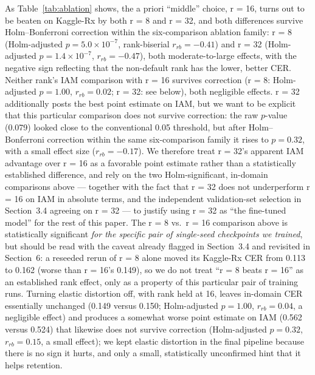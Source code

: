 \documentclass[12pt]{article}
\begin{document}
As Table~\ref{tab:ablation} shows, the a priori ``middle'' choice, r = 16, turns out to be beaten on
Kaggle-Rx by both r = 8 and r = 32, and both differences survive Holm--Bonferroni correction within the
six-comparison ablation family: r = 8 (Holm-adjusted $p = 5.0\times10^{-7}$, rank-biserial $r_{rb} = -0.41$)
and r = 32 (Holm-adjusted $p = 1.4\times10^{-7}$, $r_{rb} = -0.47$), both moderate-to-large effects, with the
negative sign reflecting that the non-default rank has the lower, better CER. Neither rank's IAM comparison
with r = 16 survives correction (r = 8: Holm-adjusted $p = 1.00$, $r_{rb} = 0.02$; r = 32: see below), both
negligible effects. r = 32 additionally posts the
best point estimate on IAM, but we want to be explicit that this particular comparison does not survive
correction: the raw $p$-value (0.079) looked close to the conventional 0.05 threshold, but after
Holm--Bonferroni correction within the same six-comparison family it rises to $p = 0.32$, with a small
effect size ($r_{rb} = -0.17$). We therefore treat r = 32's apparent IAM advantage over r = 16 as a favorable
point estimate rather than a statistically established difference, and rely on the two Holm-significant,
in-domain comparisons above --- together with the fact that r = 32 does not underperform r = 16 on IAM in
absolute terms, and the independent validation-set selection in Section~3.4 agreeing on r = 32 --- to justify
using r = 32 as ``the fine-tuned model'' for the rest of this paper. The r = 8 vs.\ r = 16 comparison above is
statistically significant \emph{for the specific pair of single-seed checkpoints we trained}, but should be
read with the caveat already flagged in Section~3.4 and revisited in Section~6: a reseeded rerun of r = 8
alone moved its Kaggle-Rx CER from 0.113 to 0.162 (worse than r = 16's 0.149), so we do not treat ``r = 8
beats r = 16'' as an established rank effect, only as a property of this particular pair of training runs.
Turning
elastic distortion off, with rank held at 16, leaves in-domain CER essentially unchanged (0.149 versus 0.150;
Holm-adjusted $p = 1.00$, $r_{rb} = 0.04$, a negligible effect) and produces a somewhat worse point estimate
on IAM (0.562 versus 0.524) that likewise does not survive correction (Holm-adjusted $p = 0.32$,
$r_{rb} = 0.15$, a small effect); we kept elastic distortion in the final pipeline because there is no sign
it hurts, and only a small, statistically unconfirmed hint that it helps retention.
\end{document}

